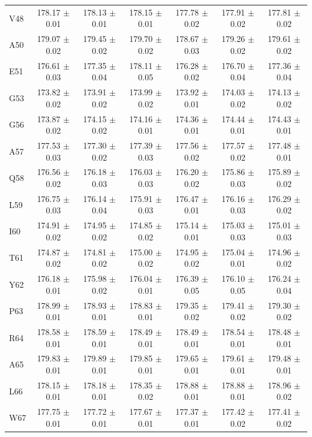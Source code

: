 \documentclass[%
 aip,
 amsmath,amssymb,
 preprint,%
]{revtex4-1}
\begin{document}
\begin{center}
\begin{longtable}{l|c|c|c|c|c|c}
V48 & 178.17 $\pm$ 0.01 & 178.13 $\pm$ 0.01 & 178.15 $\pm$ 0.01 & 177.78 $\pm$ 0.02 & 177.91 $\pm$ 0.02 & 177.81 $\pm$ 0.02 \\
A50 & 179.07 $\pm$ 0.02 & 179.45 $\pm$ 0.02 & 179.70 $\pm$ 0.02 & 178.67 $\pm$ 0.03 & 179.26 $\pm$ 0.02 & 179.61 $\pm$ 0.02 \\
E51 & 176.61 $\pm$ 0.03 & 177.35 $\pm$ 0.04 & 178.11 $\pm$ 0.05 & 176.28 $\pm$ 0.02 & 176.70 $\pm$ 0.04 & 177.36 $\pm$ 0.04 \\
G53 & 173.82 $\pm$ 0.02 & 173.91 $\pm$ 0.02 & 173.99 $\pm$ 0.02 & 173.92 $\pm$ 0.01 & 174.03 $\pm$ 0.02 & 174.13 $\pm$ 0.02 \\
G56 & 173.87 $\pm$ 0.02 & 174.15 $\pm$ 0.02 & 174.16 $\pm$ 0.01 & 174.36 $\pm$ 0.01 & 174.44 $\pm$ 0.01 & 174.43 $\pm$ 0.01 \\
A57 & 177.53 $\pm$ 0.03 & 177.30 $\pm$ 0.02 & 177.39 $\pm$ 0.03 & 177.56 $\pm$ 0.02 & 177.57 $\pm$ 0.02 & 177.48 $\pm$ 0.01 \\
Q58 & 176.56 $\pm$ 0.02 & 176.18 $\pm$ 0.03 & 176.03 $\pm$ 0.03 & 176.20 $\pm$ 0.02 & 175.86 $\pm$ 0.03 & 175.89 $\pm$ 0.02 \\
L59 & 176.75 $\pm$ 0.03 & 176.14 $\pm$ 0.04 & 175.91 $\pm$ 0.03 & 176.47 $\pm$ 0.01 & 176.16 $\pm$ 0.03 & 176.29 $\pm$ 0.02 \\
I60 & 174.91 $\pm$ 0.02 & 174.95 $\pm$ 0.02 & 174.85 $\pm$ 0.02 & 175.14 $\pm$ 0.01 & 175.03 $\pm$ 0.03 & 175.01 $\pm$ 0.03 \\
T61 & 174.87 $\pm$ 0.02 & 174.81 $\pm$ 0.02 & 175.00 $\pm$ 0.02 & 174.95 $\pm$ 0.02 & 175.04 $\pm$ 0.01 & 174.96 $\pm$ 0.02 \\
Y62 & 176.18 $\pm$ 0.01 & 175.98 $\pm$ 0.02 & 176.04 $\pm$ 0.01 & 176.39 $\pm$ 0.05 & 176.10 $\pm$ 0.05 & 176.24 $\pm$ 0.04 \\
P63 & 178.99 $\pm$ 0.01 & 178.93 $\pm$ 0.01 & 178.83 $\pm$ 0.01 & 179.35 $\pm$ 0.02 & 179.41 $\pm$ 0.02 & 179.30 $\pm$ 0.02 \\
R64 & 178.58 $\pm$ 0.01 & 178.59 $\pm$ 0.01 & 178.49 $\pm$ 0.01 & 178.49 $\pm$ 0.01 & 178.54 $\pm$ 0.01 & 178.48 $\pm$ 0.01 \\
A65 & 179.83 $\pm$ 0.01 & 179.89 $\pm$ 0.01 & 179.85 $\pm$ 0.01 & 179.65 $\pm$ 0.01 & 179.61 $\pm$ 0.01 & 179.48 $\pm$ 0.01 \\
L66 & 178.15 $\pm$ 0.01 & 178.18 $\pm$ 0.01 & 178.35 $\pm$ 0.02 & 178.88 $\pm$ 0.01 & 178.88 $\pm$ 0.01 & 178.96 $\pm$ 0.02 \\
W67 & 177.75 $\pm$ 0.01 & 177.72 $\pm$ 0.01 & 177.67 $\pm$ 0.01 & 177.37 $\pm$ 0.01 & 177.42 $\pm$ 0.02 & 177.41 $\pm$ 0.02 \\

\end{longtable}
\end{center}
\end{document}
